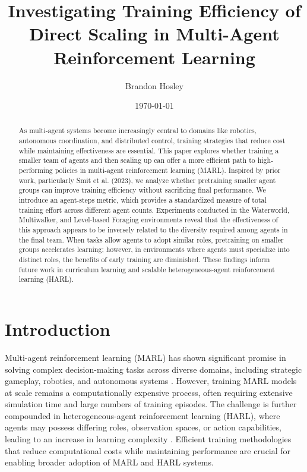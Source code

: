\documentclass{article}
\title{Investigating Training Efficiency of Direct Scaling in Multi-Agent Reinforcement Learning}
\author{Brandon Hosley}
\date{\today}
\begin{document}
\maketitle

\begin{abstract}
    As multi-agent systems become increasingly central to domains like robotics, 
    autonomous coordination, and distributed control, training strategies 
    that reduce cost while maintaining effectiveness are essential. 
    This paper explores whether training a smaller team of agents and 
    then scaling up can offer a more efficient path to high-performing policies in 
    multi-agent reinforcement learning (MARL).
    Inspired by prior work, particularly Smit et al. (2023), 
    we analyze whether pretraining smaller agent groups can improve training efficiency 
    without sacrificing final performance. 
    We introduce an agent-steps metric, which provides a standardized measure of 
    total training effort across different agent counts.
    Experiments conducted in the Waterworld, Multiwalker, and Level-based Foraging environments 
    reveal that the effectiveness of this approach appears to be inversely related 
    to the diversity required among agents in the final team. 
    When tasks allow agents to adopt similar roles, 
    pretraining on smaller groups accelerates learning; 
    however, in environments where agents must specialize into distinct roles, 
    the benefits of early training are diminished. 
    These findings inform future work in curriculum learning and scalable 
    heterogeneous-agent reinforcement learning (HARL).
\end{abstract}

\section{Introduction}

Multi-agent reinforcement learning (MARL) has shown significant promise in solving complex 
decision-making tasks across diverse domains, including strategic gameplay, robotics, 
and autonomous systems \cite{silver2016, vinyals2019, berner2019}. 
However, training MARL models at scale remains a computationally expensive process, 
often requiring extensive simulation time and large numbers of training episodes. 
The challenge is further compounded in heterogeneous-agent reinforcement learning (HARL), 
where agents may possess differing roles, observation spaces, or action capabilities, 
leading to an increase in learning complexity \cite{rizk2019, yang2021a}.
Efficient training methodologies that reduce computational costs while maintaining 
performance are crucial for enabling broader adoption of MARL and HARL systems.
\end{document}
